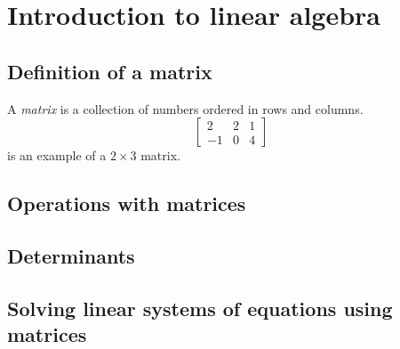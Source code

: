 \chapter{Introduction to linear algebra}

\section{Definition of a matrix}
\begin{defi}[Matrix]
    A \textit{matrix} is a collection of numbers ordered in rows and columns.
    \begin{equation}
        \begin{bmatrix} 2 & 2 & 1 \\ -1 & 0 & 4 \end{bmatrix}
    \end{equation}
    is an example of a $2\times 3$ matrix.
\end{defi}

\section{Operations with matrices}

\section{Determinants}

\section{Solving linear systems of equations using matrices}
